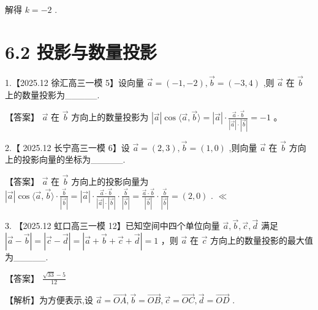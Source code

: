 \documentclass[10pt]{article}
\begin{document}
解得 \(k =  - 2\) .

\section*{6.2 投影与数量投影}

1.【2025.12 徐汇高三一模 5】设向量 \(\overrightarrow{a} = \left( {-1, - 2}\right) ,\overrightarrow{b} = \left( {-3,4}\right)\) ,则 \(\overrightarrow{a}\) 在 \(\overrightarrow{b}\) 上的数量投影为\_\_\_\_\_.

【答案】 \(\overrightarrow{a}\) 在 \(\overrightarrow{b}\) 方向上的数量投影为 \(\left| \overrightarrow{a}\right| \cos \langle \overrightarrow{a},\overrightarrow{b}\rangle  = \left| \overrightarrow{a}\right|  \cdot  \frac{\overrightarrow{a} \cdot  \overrightarrow{b}}{\left| \overrightarrow{a}\right|  \cdot  \left| \overrightarrow{b}\right| } =  - 1\) 。

2.【 2025.12 长宁高三一模 6】设 \(\overrightarrow{a} = \left( {2,3}\right) ,\overrightarrow{b} = \left( {1,0}\right)\) ,则向量 \(\overrightarrow{a}\) 在 \(\overrightarrow{b}\) 方向上的投影向量的坐标为\_\_\_\_\_.

【答案】 \(\overrightarrow{a}\) 在 \(\overrightarrow{b}\) 方向上的投影向量为 \(\left| \overrightarrow{a}\right| \cos \langle \overrightarrow{a},\overrightarrow{b}\rangle  \cdot  \frac{\overrightarrow{b}}{\left| \overrightarrow{b}\right| } = \left| \overrightarrow{a}\right|  \cdot  \frac{\overrightarrow{a} \cdot  \overrightarrow{b}}{\left| \overrightarrow{a}\right|  \cdot  \left| \overrightarrow{b}\right| } \cdot  \frac{\overrightarrow{b}}{\left| \overrightarrow{b}\right| } = \frac{\overrightarrow{a} \cdot  \overrightarrow{b}}{\left| \overrightarrow{b}\right| } \cdot  \frac{\overrightarrow{b}}{\left| \overrightarrow{b}\right| } = \left( {2,0}\right)\) . \(\ll\)

3. 【2025.12 虹口高三一模 12】已知空间中四个单位向量 \(\overrightarrow{a},\overrightarrow{b},\overrightarrow{c},\overrightarrow{d}\) 满足 \(\left| {\overrightarrow{a} - \overrightarrow{b}}\right|  = \left| {\overrightarrow{c} - \overrightarrow{d}}\right|  = \left| {\overrightarrow{a} + \overrightarrow{b} + \overrightarrow{c} + \overrightarrow{d}}\right|  = 1\) ，则 \(\overrightarrow{a}\) 在 \(\overrightarrow{c}\) 方向上的数量投影的最大值为\_\_\_\_\_.

【答案】 \(\frac{\sqrt{33} - 5}{12}\)

【解析】为方便表示,设 \(\overrightarrow{a} = \overrightarrow{OA},\overrightarrow{b} = \overrightarrow{OB},\overrightarrow{c} = \overrightarrow{OC},\overrightarrow{d} = \overrightarrow{OD}\) .
\end{document}
